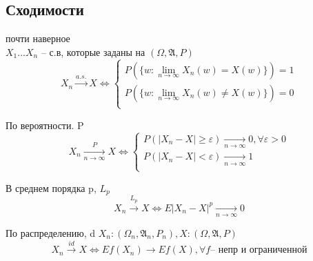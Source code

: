 \documentclass{article}
\newcommand{\A}{{\mathfrak A}}
\begin{document}
    \subsection{Сходимости}
    \begin{definition}{почти наверное}\\
    $X_1 \dots X_n $ -- с.в, которые заданы на $(\Omega, \A, P)$\\
    $$X_n \xrightarrow{a.s.} X \Leftrightarrow \begin{cases}
        P(\{w: \lim\limits_{n\to \infty} X_n(w) = X(w)\}) = 1 \\
        P(\{w: \lim\limits_{n\to \infty} X_n(w) \ne X(w)\}) = 0 \\
    \end{cases}$$
    \end{definition}
    \begin{definition}{По вероятности. P}
        $$X_n \xrightarrow[n\to\infty]{P} X \Leftrightarrow \begin{cases}
        P(|X_n - X|\ge\varepsilon) \underset{n\to\infty}\longrightarrow 0, \forall \varepsilon > 0 \\
        P(|X_n - X|<\varepsilon) \underset{n\to\infty}\longrightarrow 1 \\
    \end{cases}$$
    \end{definition}
    \begin{definition} {В среднем порядка p, $L_p$}
        $$X_n \xrightarrow{L_p} X \Leftrightarrow E|X_n-X|^p \underset{n\to\infty}{\longrightarrow} 0$$
    \end{definition}
    \begin{definition}{По распределению, d}
        $X_n: (\Omega_n, \A_n, P_n), X: (\Omega, \A, P)$
        $$ X_n \xrightarrow{id} X \Leftrightarrow Ef(X_n) \to Ef(X), \forall f \text{--  непр и ограниченной}$$
    \end{definition}
\end{document}
